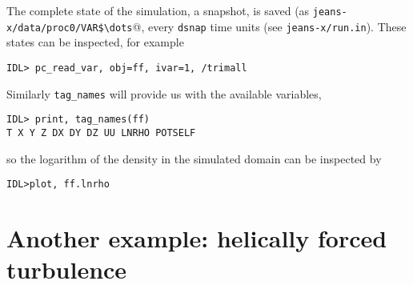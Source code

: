 \documentclass[a4paper,12pt]{article}
\begin{document}
The complete state of the simulation, a snapshot, is saved (as
\verb|jeans-x/data/proc0/VAR$\dots|@, every \verb|dsnap|
time units
(see \verb|jeans-x/run.in|). These states can be inspected, for example
\begin{verbatim}
IDL> pc_read_var, obj=ff, ivar=1, /trimall
\end{verbatim}
Similarly \verb|tag_names| will provide us with the available variables, 
\begin{verbatim}
IDL> print, tag_names(ff)
T X Y Z DX DY DZ UU LNRHO POTSELF
\end{verbatim}
so the logarithm of the density in the simulated domain can be inspected by
\begin{verbatim}
IDL>plot, ff.lnrho
\end{verbatim}


\section{Another example: helically forced turbulence}


\end{document}
